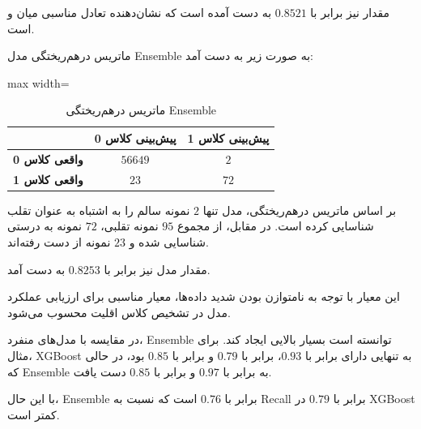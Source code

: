 \documentclass[10pt,a4paper,twocolumn]{article}
\begin{document}
مقدار  نیز برابر با $0.8521$ به دست آمده است که
نشان‌دهنده تعادل مناسبی میان  و  است.

ماتریس درهم‌ریختگی مدل Ensemble به صورت زیر به دست آمد:

\begin{table}[H]

\centering

\caption{ماتریس درهم‌ریختگی Ensemble}

\vspace{0.15cm}

\begin{adjustbox}{max width=\columnwidth}

\begin{tabular}{|c|c|c|}

\hline

&
\textbf{پیش‌بینی کلاس 0} &
\textbf{پیش‌بینی کلاس 1} \\

\hline

\textbf{واقعی کلاس 0} &
$56649$ &
$2$ \\

\hline

\textbf{واقعی کلاس 1} &
$23$ &
$72$ \\

\hline

\end{tabular}

\end{adjustbox}

\label{tab:ensemble-confusion}

\end{table}

بر اساس ماتریس درهم‌ریختگی، مدل تنها $2$ نمونه سالم را به
اشتباه به عنوان تقلب شناسایی کرده است. در مقابل، از مجموع
$95$ نمونه تقلبی، $72$ نمونه به درستی شناسایی شده و $23$
نمونه از دست رفته‌اند.

مقدار  مدل نیز برابر با $0.8253$ به دست آمد.

این معیار با توجه به نامتوازن بودن شدید داده‌ها، معیار
مناسبی برای ارزیابی عملکرد مدل در تشخیص کلاس اقلیت محسوب
می‌شود.

در مقایسه با مدل‌های منفرد، Ensemble توانسته است
 بسیار بالایی ایجاد کند. برای مثال، XGBoost
به تنهایی دارای  برابر با $0.93$،
 برابر با $0.79$ و
 برابر با $0.85$ بود، در حالی که Ensemble به
 برابر با $0.97$ و
 برابر با $0.85$ دست یافت.

با این حال،  Ensemble برابر با $0.76$ است که
نسبت به Recall برابر با $0.79$ در XGBoost کمتر است.
\end{document}
